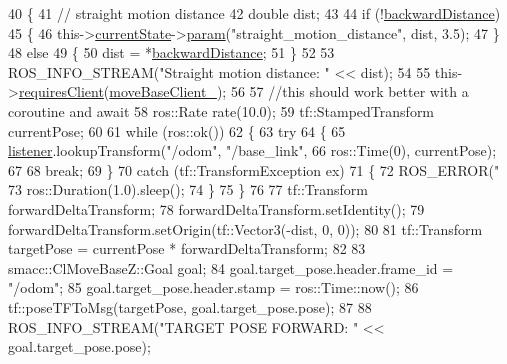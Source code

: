 \begin{DoxyCode}
40     \{
41         \textcolor{comment}{// straight motion distance}
42         \textcolor{keywordtype}{double} dist;
43 
44         \textcolor{keywordflow}{if} (!\hyperlink{classsm__dance__bot_1_1CbNavigateBackwards_ace20c1dfa7b8e84c754aedbd3dd00fdf}{backwardDistance})
45         \{
46             this->\hyperlink{classsmacc_1_1SmaccClientBehavior_af76fc9b877542ed5caf033f820c107d0}{currentState}->\hyperlink{classsmacc_1_1ISmaccState_a4982f2187ed6da337462721146e8ef70}{param}(\textcolor{stringliteral}{"straight\_motion\_distance"}, dist, 3.5);
47         \}
48         \textcolor{keywordflow}{else}
49         \{
50             dist = *\hyperlink{classsm__dance__bot_1_1CbNavigateBackwards_ace20c1dfa7b8e84c754aedbd3dd00fdf}{backwardDistance};
51         \}
52 
53         ROS\_INFO\_STREAM(\textcolor{stringliteral}{"Straight motion distance: "} << dist);
54 
55         this->\hyperlink{classsmacc_1_1SmaccClientBehavior_a917f001e763a1059af337bf4e164f542}{requiresClient}(\hyperlink{classsm__dance__bot_1_1CbNavigateBackwards_ae4cd503172b4f5c7b0dba49aec08885e}{moveBaseClient\_});
56 
57         \textcolor{comment}{//this should work better with a coroutine and await}
58         ros::Rate rate(10.0);
59         tf::StampedTransform currentPose;
60 
61         \textcolor{keywordflow}{while} (ros::ok())
62         \{
63             \textcolor{keywordflow}{try}
64             \{
65                 \hyperlink{classsm__dance__bot_1_1CbNavigateBackwards_a4ec9af0d5b94c5e0654a768c36bec85b}{listener}.lookupTransform(\textcolor{stringliteral}{"/odom"}, \textcolor{stringliteral}{"/base\_link"},
66                                          ros::Time(0), currentPose);
67 
68                 \textcolor{keywordflow}{break};
69             \}
70             \textcolor{keywordflow}{catch} (tf::TransformException ex)
71             \{
72                 ROS\_ERROR(\textcolor{stringliteral}{"%
73                 ros::Duration(1.0).sleep();
74             \}
75         \}
76 
77         tf::Transform forwardDeltaTransform;
78         forwardDeltaTransform.setIdentity();
79         forwardDeltaTransform.setOrigin(tf::Vector3(-dist, 0, 0));
80 
81         tf::Transform targetPose = currentPose * forwardDeltaTransform;
82 
83         smacc::ClMoveBaseZ::Goal goal;
84         goal.target\_pose.header.frame\_id = \textcolor{stringliteral}{"/odom"};
85         goal.target\_pose.header.stamp = ros::Time::now();
86         tf::poseTFToMsg(targetPose, goal.target\_pose.pose);
87 
88         ROS\_INFO\_STREAM(\textcolor{stringliteral}{"TARGET POSE FORWARD: "} << goal.target\_pose.pose);
}
\end{DoxyCode}
